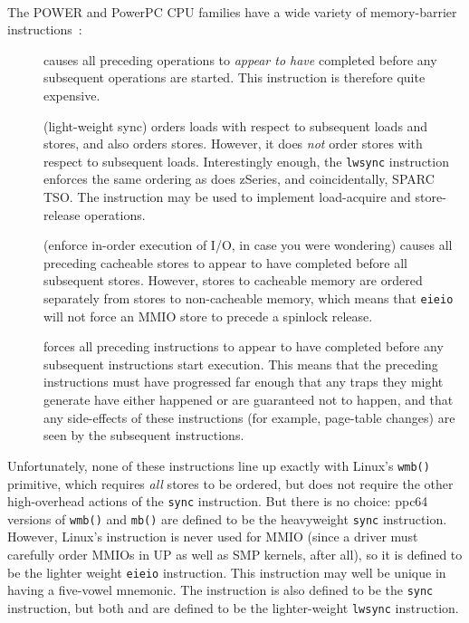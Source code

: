 The POWER and PowerPC\textsuperscript{\textregistered}
CPU families have a wide variety of memory-barrier
instructions~\cite{PowerPC94,MichaelLyons05a}:
\begin{description}
\item	[] causes all preceding operations to {\em appear to have}
	completed before any subsequent operations are started.
	This instruction is therefore quite expensive.
\item	[] (light-weight sync) orders loads with respect to
	subsequent loads and stores, and also orders stores.
	However, it does {\em not} order stores with respect to subsequent
	loads.
	Interestingly enough, the {\tt lwsync} instruction enforces
	the same ordering as does zSeries, and coincidentally,
	SPARC TSO.
	The  instruction may be used to implement
	load-acquire and store-release operations.
\item	[] (enforce in-order execution of I/O, in case you
	were wondering) causes all preceding cacheable stores to appear
	to have completed before all subsequent stores.
	However, stores to cacheable memory are ordered separately from
	stores to non-cacheable memory, which means that {\tt eieio}
	will not force an MMIO store to precede a spinlock release.
\item	[] forces all preceding instructions to appear to have
	completed before any subsequent instructions start execution.
	This means that the preceding instructions must have progressed
	far enough that any traps they might generate have either happened
	or are guaranteed not to happen, and that any side-effects of
	these instructions (for example, page-table changes) are seen by the
	subsequent instructions.
\end{description}

Unfortunately, none of these instructions line up exactly with Linux's
{\tt wmb()} primitive, which requires {\em all} stores to be ordered,
but does not require the other high-overhead actions of the {\tt sync}
instruction.
But there is no choice: ppc64 versions of {\tt wmb()} and {\tt mb()} are
defined to be the heavyweight {\tt sync} instruction.
However, Linux's  instruction is never used for MMIO
(since a driver must carefully order MMIOs in UP as well as
SMP kernels, after all), so it is defined to be the lighter weight
{\tt eieio} instruction.
This instruction may well be unique in having a five-vowel mnemonic.
The  instruction is also defined to be the {\tt sync}
instruction, but both  and  are defined to
be the lighter-weight {\tt lwsync} instruction.

